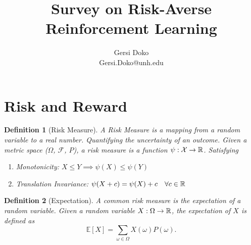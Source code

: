 \documentclass[10pt]{article}
\title{Survey on Risk-Averse Reinforcement Learning}
\author{Gersi Doko \\
        Gersi.Doko@unh.edu \\}
\newtheorem{definition}{Definition}
\theoremstyle{plain}
\theoremstyle{remark}
\begin{document}
\maketitle

\section{Risk and Reward}

\begin{definition}[Risk Measure]
        \label{def:risk}
        A Risk Measure is a mapping from a random variable to a real number. Quantifying the uncertainty of an outcome.
        Given a metric space ($\Omega$, $\mathcal{F}$, $P$), a risk measure is a function $\psi: \mathcal{X} \to \mathbb{R}$. Satisfying
        \begin{enumerate}
                \item Monotonicity: $X \leq Y \implies \psi(X) \leq \psi(Y)$
                \item Translation Invariance: $\psi(X + c) = \psi(X) + c \quad \forall c \in \mathbb{R}$
        \end{enumerate}
\end{definition}

\begin{definition}[Expectation]
        \label{def:expectation}
        A common risk measure is the expectation of a random variable. Given a random variable $X: \Omega \to \mathbb{R}$, the expectation of $X$ is defined as
        $$\mathbb{E}[X] = \sum_{\omega \in \Omega} X(\omega) P(\omega).$$
\end{definition}
\end{document}
